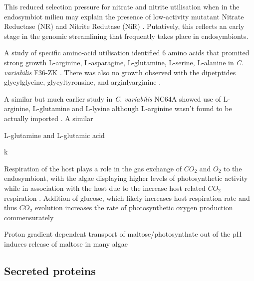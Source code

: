 This reduced selection pressure for nitrate and nitrite utilisation when in the endosymbiot
milieu may explain the presence of low-activity mutatant Nitrate Reductase (NR) and Nitrite
Redutase (NiR) \citep{Kato2009}. 
Putatively, this reflects an early stage in the genomic streamlining that frequently
takes place in endosymbionts. 


A study of specific amino-acid utilisation identified
6 amino acids that promited strong growth L-arginine, L-asparagine,
L-glutamine, L-serine, L-alanine in \textit{C. variabilis} F36-ZK \citep{Kato2006}.
There was also no growth observed with the dipetptides
glycylglycine, glycyltyronsine, and arginlyarginine \citep{Kato2006}.

A similar but much earlier study in \textit{C. variabilis} NC64A
showed use of L-arginine, L-glutamine and L-lysine although L-arginine wasn't
found to be actually imported \citep{McAuley1986}.  A similar




L-glutamine and L-glutamic acid

k








 Respiration of the host plays a role in the gas exchange of \(CO_2\) and \(O_2\) 
 to the endosymbiont, with the algae displaying higher levels of photosynthetic
 activity while in association with the host due to the increase host related 
 \(CO_2\) respiration \citep{Reisser1980}.
Addition of glucose, which likely increases host respiration rate and thus \(CO_2\)
evolution increases the rate of photosynthetic oxygen production commensurately \citep{Reisser1980}




Proton gradient dependent transport of maltose/photosynthate out of the \citep{Schussler1992}
pH induces release of maltose in many algae \citep{}

%


\subsection{Secreted proteins}

